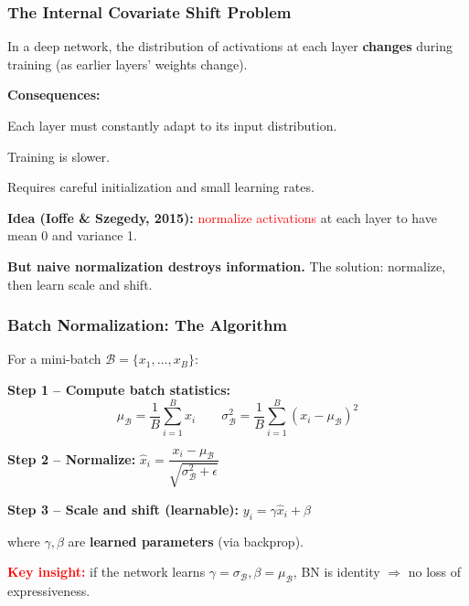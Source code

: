 \documentclass[notes,11pt, aspectratio=169]{beamer}
\newenvironment{wideitemize}{\itemize\addtolength{\itemsep}{10pt}}{\enditemize}
\begin{document}
\begin{frame}
\frametitle{The Internal Covariate Shift Problem}

In a deep network, the distribution of activations at each layer \textbf{changes} during training (as earlier layers' weights change).

\vspace{6pt}
\textbf{Consequences:}
\begin{wideitemize}
    \item Each layer must constantly adapt to its input distribution.
    \item Training is slower.
    \item Requires careful initialization and small learning rates.
\end{wideitemize}

\vspace{8pt}
\textbf{Idea (Ioffe \& Szegedy, 2015):} \textcolor{red}{normalize activations} at each layer to have mean 0 and variance 1.

\vspace{6pt}
\textbf{But naive normalization destroys information.} The solution: normalize, then learn scale and shift.
\end{frame}

\begin{frame}
\frametitle{Batch Normalization: The Algorithm}

For a mini-batch $\mathcal{B} = \{x_1, \ldots, x_B\}$:

\vspace{4pt}
\textbf{Step 1 -- Compute batch statistics:}
\[
    \mu_{\mathcal{B}} = \frac{1}{B}\sum_{i=1}^{B} x_i \qquad \sigma_{\mathcal{B}}^2 = \frac{1}{B}\sum_{i=1}^{B} (x_i - \mu_{\mathcal{B}})^2
\]

\textbf{Step 2 -- Normalize:} \quad $\hat{x}_i = \dfrac{x_i - \mu_{\mathcal{B}}}{\sqrt{\sigma_{\mathcal{B}}^2 + \epsilon}}$

\vspace{6pt}
\textbf{Step 3 -- Scale and shift (learnable):} \quad $y_i = \gamma \hat{x}_i + \beta$

\vspace{4pt}
where $\gamma, \beta$ are \textbf{learned parameters} (via backprop).

\vspace{6pt}
\textcolor{red}{\textbf{Key insight:}} if the network learns $\gamma = \sigma_{\mathcal{B}}, \beta = \mu_{\mathcal{B}}$, BN is identity $\Rightarrow$ no loss of expressiveness.
\end{frame}
\end{document}
